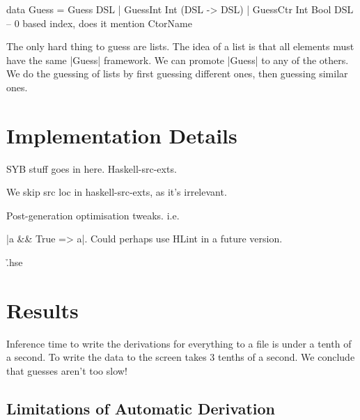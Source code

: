 \documentclass[preprint]{sigplanconf}
\begin{document}
\begin{code}
data Guess = Guess DSL
           | GuessInt Int (DSL -> DSL)
           | GuessCtr Int Bool DSL  -- 0 based index, does it mention CtorName
\end{code}

The only hard thing to guess are lists. The idea of a list is that all elements must have the same |Guess| framework. We can promote |Guess| to any of the others. We do the guessing of lists by first guessing different ones, then guessing similar ones.

\section{Implementation Details}
\label{sec:implementation}

SYB stuff goes in here. Haskell-src-exts.

We skip src loc in haskell-src-exts, as it's irrelevant.

Post-generation optimisation tweaks. i.e. \ignore|a && True => a|. Could perhaps use HLint in a future version.

\h{.hse}

\section{Results}
\label{sec:results}

Inference time to write the derivations for everything to a file is under a tenth of a second. To write the data to the screen takes 3 tenths of a second. We conclude that guesses aren't too slow!

\subsection{Limitations of Automatic Derivation}
\label{sec:failure}
\end{document}
